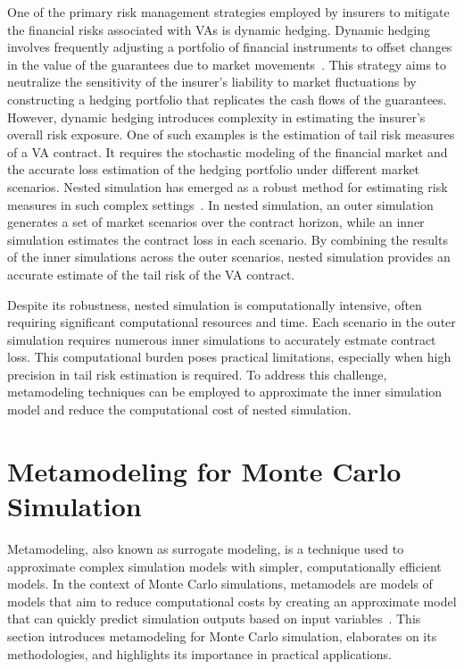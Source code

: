 One of the primary risk management strategies employed by insurers to mitigate the financial risks associated with VAs is dynamic hedging. 
Dynamic hedging involves frequently adjusting a portfolio of financial instruments to offset changes in the value of the guarantees due to market movements~\citep{hull2016options}. 
This strategy aims to neutralize the sensitivity of the insurer's liability to market fluctuations by constructing a hedging portfolio that replicates the cash flows of the guarantees.
However, dynamic hedging introduces complexity in estimating the insurer's overall risk exposure.
One of such examples is the estimation of tail risk measures of a VA contract.
It requires the stochastic modeling of the financial market and the accurate loss estimation of the hedging portfolio under different market scenarios.
Nested simulation has emerged as a robust method for estimating risk measures in such complex settings~\citep{gordy2010nested}.
In nested simulation, an outer simulation generates a set of market scenarios over the contract horizon, while an inner simulation estimates the contract loss in each scenario.
By combining the results of the inner simulations across the outer scenarios, nested simulation provides an accurate estimate of the tail risk of the VA contract.

Despite its robustness, nested simulation is computationally intensive, often requiring significant computational resources and time. 
Each scenario in the outer simulation requires numerous inner simulations to accurately estmate contract loss. 
This computational burden poses practical limitations, especially when high precision in tail risk estimation is required.
To address this challenge, metamodeling techniques can be employed to approximate the inner simulation model and reduce the computational cost of nested simulation.

\section{Metamodeling for Monte Carlo Simulation}

Metamodeling, also known as surrogate modeling, is a technique used to approximate complex simulation models with simpler, computationally efficient models. 
In the context of Monte Carlo simulations, metamodels are models of models that aim to reduce computational costs by creating an approximate model that can quickly predict simulation outputs based on input variables~\citep{kleijnen2018design}. 
This section introduces metamodeling for Monte Carlo simulation, elaborates on its methodologies, and highlights its importance in practical applications.

